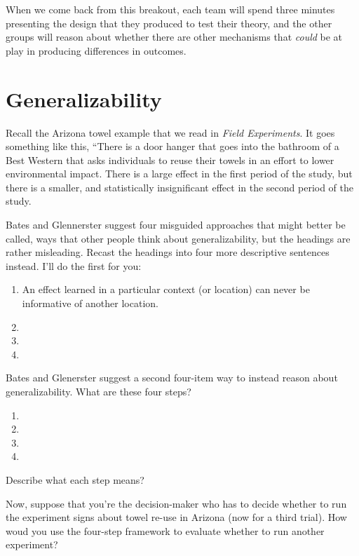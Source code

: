\documentclass[
]{book}
\providecommand{\tightlist}{%
  \setlength{\itemsep}{0pt}\setlength{\parskip}{0pt}}
\begin{document}
When we come back from this breakout, each team will spend three minutes
presenting the design that they produced to test their theory, and the
other groups will reason about whether there are other mechanisms that
\emph{could} be at play in producing differences in outcomes.

\hypertarget{generalizability}{%
\section{Generalizability}\label{generalizability}}

Recall the Arizona towel example that we read in \emph{Field
Experiments}. It goes something like this, ``There is a door hanger that
goes into the bathroom of a Best Western that asks individuals to reuse
their towels in an effort to lower environmental impact. There is a
large effect in the first period of the study, but there is a smaller,
and statistically insignificant effect in the second period of the
study.

Bates and Glennerster suggest four misguided approaches that might
better be called, ways that other people think about generalizability,
but the headings are rather misleading. Recast the headings into four
more descriptive sentences instead. I'll do the first for you:

\begin{enumerate}
\def\labelenumi{\arabic{enumi}.}
\tightlist
\item
  An effect learned in a particular context (or location) can never be
  informative of another location.
\item
\item
\item
\end{enumerate}

Bates and Glenerster suggest a second four-item way to instead reason
about generalizability. What are these four steps?

\begin{enumerate}
\def\labelenumi{\arabic{enumi}.}
\tightlist
\item
\item
\item
\item
\end{enumerate}

Describe what each step means?

Now, suppose that you're the decision-maker who has to decide whether to
run the experiment signs about towel re-use in Arizona (now for a third
trial). How woud you use the four-step framework to evaluate whether to
run another experiment?
\end{document}

